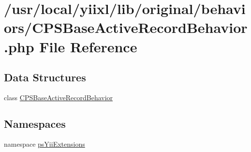 \hypertarget{CPSBaseActiveRecordBehavior_8php}{
\section{/usr/local/yiixl/lib/original/behaviors/CPSBaseActiveRecordBehavior.php File Reference}
\label{CPSBaseActiveRecordBehavior_8php}
}
\subsection*{Data Structures}
\begin{DoxyCompactItemize}
\item 
class \hyperlink{classCPSBaseActiveRecordBehavior}{CPSBaseActiveRecordBehavior}
\end{DoxyCompactItemize}
\subsection*{Namespaces}
\begin{DoxyCompactItemize}
\item 
namespace \hyperlink{namespacepsYiiExtensions}{psYiiExtensions}
\end{DoxyCompactItemize}
